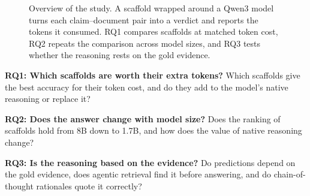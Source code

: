 \documentclass[11pt]{article}
\begin{document}
\begin{figure}[t]
\caption{Overview of the study. A scaffold wrapped around a Qwen3 model
turns each claim--document pair into a verdict and reports the tokens it
consumed. RQ1 compares scaffolds at matched token cost, RQ2 repeats the
comparison across model sizes, and RQ3 tests whether the reasoning rests on
the gold evidence.}
\label{fig:overview}
\end{figure}

\noindent \textbf{RQ1: Which scaffolds are worth their extra tokens?} Which
scaffolds give the best accuracy for their token cost, and do they add to
the model's native reasoning or replace it?

\noindent \textbf{RQ2: Does the answer change with model size?} Does the
ranking of scaffolds hold from 8B down to 1.7B, and how does the value of
native reasoning change?

\noindent \textbf{RQ3: Is the reasoning based on the evidence?} Do
predictions depend on the gold evidence, does agentic retrieval find it
before answering, and do chain-of-thought rationales quote it correctly?
\end{document}
